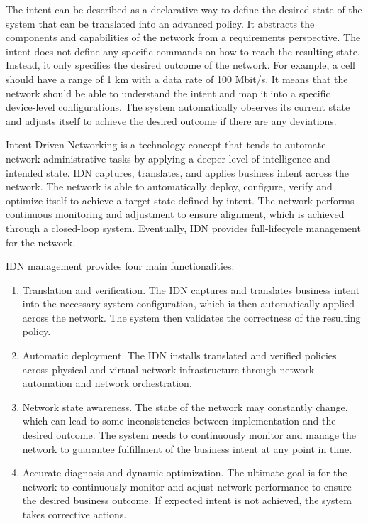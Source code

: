 The intent can be described as a declarative way to define the desired state of the system that can be translated into an advanced policy. It abstracts the components and capabilities of the network from a requirements perspective. The intent does not define any specific commands on how to reach the resulting state. Instead, it only specifies the desired outcome of the network. For example, a cell should have a range of 1 km with a data rate of 100 Mbit/s.\cite{Mwanje2021} It means that the network should be able to understand the intent and map it into a specific device-level configurations.  The system automatically observes its current state and adjusts itself to achieve the desired outcome if there are any deviations. \cite[22867]{8968429}

Intent-Driven Networking is a technology concept that tends to automate network administrative tasks by applying a deeper level of intelligence and intended state. IDN captures, translates, and applies business intent across the network. The network is able to automatically deploy, configure, verify and optimize itself to achieve a target state defined by intent. The network performs continuous monitoring and adjustment to ensure alignment, which is achieved through a closed-loop system. Eventually, IDN provides full-lifecycle management for the network.\cite{8968429}

IDN management provides four main functionalities\cite[271]{Wei2020}: 

\begin{enumerate}
  \item Translation and verification. The IDN captures and translates business intent into the necessary system configuration, which is then automatically applied across the network. The system then validates the correctness of the resulting policy.
  \item Automatic deployment. The IDN installs translated and verified policies across physical and virtual network infrastructure through network automation and network orchestration.
  \item Network state awareness. The state of the network may constantly change, which can lead to some inconsistencies between implementation and the desired outcome. The system needs to continuously monitor and manage the network to guarantee fulfillment of the business intent at any point in time.
  \item Accurate diagnosis and dynamic optimization. The ultimate goal is for the network to continuously monitor and adjust network performance to ensure the desired business outcome. If expected intent is not achieved, the system takes corrective actions.
\end{enumerate}


